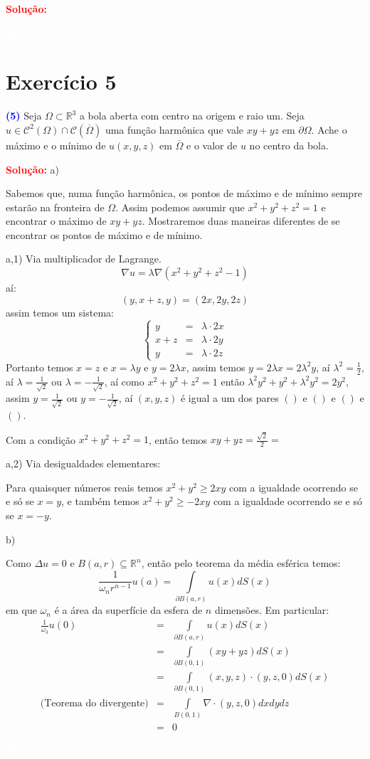 \documentclass[11pt,a4paper]{article}
\newcommand{\exercicio}[1]{\section*{Exercício #1} \textcolor{blue}{\bf(#1)}}
\newcommand{\solucao}[1]{\begin{mdframed}[style=MyFrame]
\textbf{\textcolor{red}{Solução:}} #1
\end{mdframed}\textcolor{white}{Oi} \newline}
\begin{document}
\solucao{}


\exercicio{5}
Seja $\Omega \subset \mathbb{R}^3$ a bola aberta com centro na origem e raio um. Seja  $u \in \mathcal{C}^2(\Omega) \cap \mathcal{C}(\overline{\Omega})$ uma função harmônica que vale $xy + yz$ em $\partial\Omega$. Ache o máximo e o mínimo de $u(x, y, z)$ em $\overline{\Omega}$ e o valor de $u$ no centro da bola.
\solucao{
a)

\medskip
\noindent
Sabemos que, numa função harmônica, os pontos de máximo e de mínimo sempre estarão na fronteira de $\Omega$. Assim podemos assumir que $x^2+y^2+z^2=1$ e encontrar o máximo de $xy+yz$. Mostraremos duas maneiras diferentes de se encontrar os pontos de máximo e de mínimo.

\medskip
\noindent
a,1) Via multiplicador de Lagrange.
\[
\nabla u=\lambda \nabla(x^2+y^2+z^2-1)
\]
aí:
\[
(y,x+z,y)=(2x,2y,2z)
\]
assim temos um sistema:
\[
\left\{
\begin{array}{rcl}
y&=&\lambda\cdot 2x\\
x+z&=&\lambda \cdot 2y\\
y&=&\lambda\cdot 2z
\end{array}
\right.
\]
Portanto temos $x=z$ e $x=\lambda y$ e $y=2\lambda x$, assim temos $y=2\lambda x=2\lambda^2 y$, aí $\lambda^2=\frac{1}{2}$, aí $\lambda=\frac{1}{\sqrt{2}}$ ou $\lambda=-\frac{1}{\sqrt{2}}$, aí como $x^2+y^2+z^2=1$ então $\lambda^2 y^2+y^2+\lambda^2 y^2= 2y^2$, assim $y=\frac{1}{\sqrt{2}}$ ou $y=-\frac{1}{\sqrt{2}}$, aí $(x,y,z)$ é igual a um dos pares $()$ e $()$ e $()$ e $()$.

\medskip
\noindent
Com a condição $x^2+y^2+z^2=1$, então temos $xy+yz=\frac{\sqrt{2}}{2}=$

\medskip
\noindent
a,2) Via desigualdades elementares:

\medskip
\noindent
Para quaisquer números reais temos $x^2+y^2\geq 2xy$ com a igualdade ocorrendo se e só se $x=y$, e também temos $x^2+y^2\geq -2xy$ com a igualdade ocorrendo se e só se $x=-y$.

\medskip
\noindent
b)

\medskip
\noindent
Como $\Delta u=0$ e $B(a,r)\subseteq\mathbb{R}^n$, então pelo teorema da média esférica temos:
\[
\frac{1}{\omega_n r^{n-1}}u(a)=\int\limits_{\partial B(a,r)}u(x)dS(x)
\]
em que $\omega_n$ é a área da superfície da esfera de $n$ dimensões. Em particular:
\[
\begin{array}{rcl}
\frac{1}{\omega_3}u(0)&=&\int\limits_{\partial B(a,r)}u(x)dS(x)\\&=&\int\limits_{\partial B(0,1)}(xy+yz)dS(x)\\&=&\int\limits_{\partial B(0,1)}(x,y,z)\cdot(y,z,0)dS(x)\\\text{(Teorema do divergente)}&=&\int\limits_{B(0,1)}\nabla\cdot(y,z,0)dxdydz\\&=&0
\end{array}
\]
}
\end{document}
